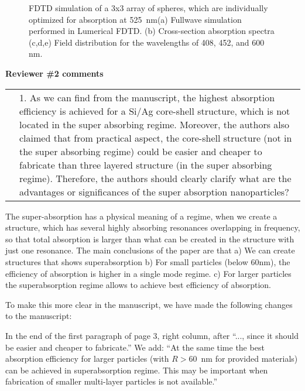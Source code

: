 \documentclass[a4paper]{article}
\begin{document}
\begin{figure}
    \caption{ FDTD simulation of a 3x3 array of spheres, which are
      individually optimized for absorption at 525~nm(a) Fullwave
      simulation performed in Lumerical FDTD. (b) Cross-section
      absorption spectra (c,d,e) Field distribution for the
      wavelengths of 408, 452, and 600 nm.\label{fig:fdtd-3x3}}%
\end{figure}


\vspace{10pt}

\newpage
\begin{minipage}{1.0\linewidth}
  \textbf{Reviewer \#2 comments}\\
  \begin{tabular}[!H]{l|p{}}
    \quad & 1.  As we can find from the manuscript, the highest
    absorption efficiency is achieved for a Si/Ag core-shell
    structure, which is not located in the super absorbing
    regime. Moreover, the authors also claimed that from practical
    aspect, the core-shell structure (not in the super absorbing
    regime) could be easier and cheaper to fabricate than three
    layered structure (in the super absorbing regime). Therefore, the
    authors should clearly clarify what are the advantages or
    significances of the super absorption nanoparticles?
\end{tabular}
\end{minipage}

The super-absorption has a physical meaning of a regime, when we
create a structure, which has several highly absorbing resonances
overlapping in frequency, so that total absorption is larger than what
can be created in the structure with just one resonance. The main conclusions of the paper are
that a) We can create structures that shows superabsorption b) For
small particles (below 60nm), the efficiency of absorption is higher
in a single mode regime.  c) For larger particles the superabsorption
regime allows to achieve best efficiency of absorption.

To make this more clear in the manuscript, we have made the following changes to the manuscript: 

In the end of the first paragraph of page 3, right column, after
``..., since it should be easier and cheaper to fabricate.'' We add:
``At the same time the best absorption efficiency for larger particles
(with $R>60$~nm for provided materials) can be achieved in
superabsorption regime. This may be important when fabrication of
smaller multi-layer particles is not available.''
\end{document}
